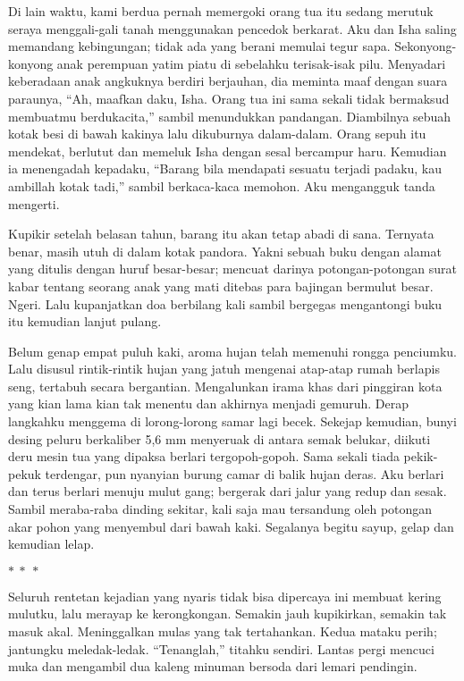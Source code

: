 \documentclass[smalldemyvopaper,11pt,twoside,onecolumn,openright,extrafontsizes]{memoir}
\newcommand\separator{
  \begin{center}
    \(\ast~\ast~\ast\)
  \end{center}
}
\begin{document}
Di lain waktu, kami berdua pernah memergoki orang tua itu sedang merutuk seraya menggali-gali tanah menggunakan pencedok berkarat. Aku dan Isha saling memandang kebingungan; tidak ada yang berani memulai tegur sapa. Sekonyong-konyong anak perempuan yatim piatu di sebelahku terisak-isak pilu. Menyadari keberadaan anak angkuknya berdiri berjauhan, dia meminta maaf dengan suara paraunya, ``Ah, maafkan daku, Isha. Orang tua ini sama sekali tidak bermaksud membuatmu berdukacita,'' sambil menundukkan pandangan. Diambilnya sebuah kotak besi di bawah kakinya lalu dikuburnya dalam-dalam. Orang sepuh itu mendekat, berlutut dan memeluk Isha dengan sesal bercampur haru. Kemudian ia menengadah kepadaku, ``Barang bila mendapati sesuatu terjadi padaku, kau ambillah kotak tadi,'' sambil berkaca-kaca memohon. Aku mengangguk tanda mengerti.

Kupikir setelah belasan tahun, barang itu akan tetap abadi di sana. Ternyata benar, masih utuh di dalam kotak pandora. Yakni sebuah buku dengan alamat yang ditulis dengan huruf besar-besar; mencuat darinya potongan-potongan surat kabar tentang seorang anak yang mati ditebas para bajingan bermulut besar. Ngeri. Lalu kupanjatkan doa berbilang kali sambil bergegas mengantongi buku itu kemudian lanjut pulang.

Belum genap empat puluh kaki, aroma hujan telah memenuhi rongga penciumku. Lalu disusul rintik-rintik hujan yang jatuh mengenai atap-atap rumah berlapis seng, tertabuh secara bergantian. Mengalunkan irama khas dari pinggiran kota yang kian lama kian tak menentu dan akhirnya menjadi gemuruh. Derap langkahku menggema di lorong-lorong samar lagi becek. Sekejap kemudian, bunyi desing peluru berkaliber 5,6 mm menyeruak di antara semak belukar, diikuti deru mesin tua yang dipaksa berlari tergopoh-gopoh. Sama sekali tiada pekik-pekuk terdengar, pun nyanyian burung camar di balik hujan deras. Aku berlari dan terus berlari menuju mulut gang; bergerak dari jalur yang redup dan sesak. Sambil meraba-raba dinding sekitar, kali saja mau tersandung oleh potongan akar pohon yang menyembul dari bawah kaki. Segalanya begitu sayup, gelap dan kemudian lelap.

\separator{}


\noindent Seluruh rentetan kejadian yang nyaris tidak bisa dipercaya ini membuat kering mulutku, lalu merayap ke kerongkongan. Semakin jauh kupikirkan, semakin tak masuk akal. Meninggalkan mulas yang tak tertahankan. Kedua mataku perih; jantungku meledak-ledak. ``Tenanglah,'' titahku sendiri. Lantas pergi mencuci muka dan mengambil dua kaleng minuman bersoda dari lemari pendingin.
\end{document}
